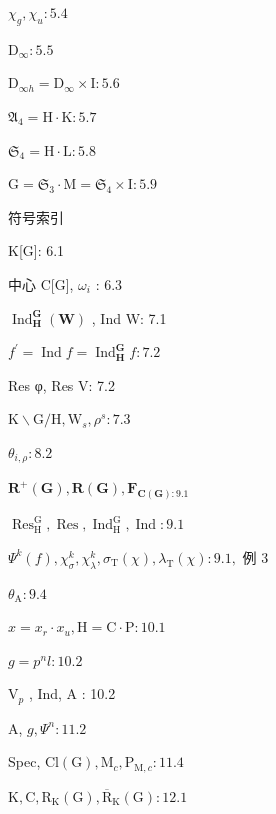 \documentclass[10pt]{article}
\begin{document}
\({\chi }_{g},{\chi }_{u} : {5.4}\)

\({\mathrm{D}}_{\infty } : {5.5}\)

\({\mathrm{D}}_{\infty h} = {\mathrm{D}}_{\infty } \times  \mathrm{I} : {5.6}\)

\({\mathfrak{A}}_{4} = \mathrm{H} \cdot  \mathrm{K} : {5.7}\)

\({\mathfrak{S}}_{4} = \mathrm{H} \cdot  \mathrm{L} : {5.8}\)

\(\mathrm{G} = {\mathfrak{S}}_{3} \cdot  \mathrm{M} = {\mathfrak{S}}_{4} \times  \mathrm{I} : {5.9}\)

符号索引

K[G]: 6.1

中心 C[G], \({\omega }_{i}\) : 6.3

\({\operatorname{Ind}}_{\mathbf{H}}^{\mathbf{G}}\left( \mathbf{W}\right)\) , Ind W: 7.1

\({f}^{\prime } = \operatorname{Ind}f = {\operatorname{Ind}}_{\mathbf{H}}^{\mathbf{G}}f : {7.2}\)

Res φ, Res V: 7.2

\(\mathrm{K} \smallsetminus  \mathrm{G}/\mathrm{H},{\mathrm{W}}_{s},{\rho }^{s} : {7.3}\)

\({\theta }_{i,\rho } : {8.2}\)

\({\mathbf{R}}^{ + }\left( \mathbf{G}\right) ,\mathbf{R}\left( \mathbf{G}\right) ,{\mathbf{F}}_{\mathbf{C}\left( \mathbf{G}\right)  : {9.1}}\)

\({\operatorname{Res}}_{\mathrm{H}}^{\mathrm{G}},\operatorname{Res},{\operatorname{Ind}}_{\mathrm{H}}^{\mathrm{G}},\operatorname{Ind} : {9.1}\)

\({\Psi }^{k}\left( f\right) ,{\chi }_{\sigma }^{k},{\chi }_{\lambda }^{k},{\sigma }_{\mathrm{T}}\left( \chi \right) ,{\lambda }_{\mathrm{T}}\left( \chi \right)  : {9.1},\) 例 3

\({\theta }_{\mathrm{A}} : {9.4}\)

\(x = {x}_{r} \cdot  {x}_{u},\mathrm{H} = \mathrm{C} \cdot  \mathrm{P} : {10.1}\)

\(g = {p}^{n}l : {10.2}\)

\({\mathrm{V}}_{p}\) , Ind, A : 10.2

A, \(g,{\Psi }^{n} : {11.2}\)

Spec, \(\mathrm{{Cl}}\left( \mathrm{G}\right) ,{\mathrm{M}}_{c},{\mathrm{P}}_{\mathrm{M},c} : {11.4}\)

\(\mathrm{K},\mathrm{C},{\mathrm{R}}_{\mathrm{K}}\left( \mathrm{G}\right) ,{\overline{\mathrm{R}}}_{\mathrm{K}}\left( \mathrm{G}\right)  : {12.1}\)
\end{document}
